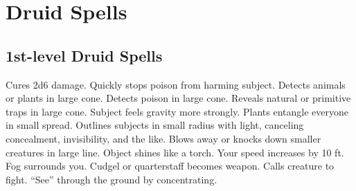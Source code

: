 \section{Druid Spells}\label{Druid Spells}

\subsection{1st-level Druid Spells}
\begin{spelllist}
   Cures 2d6 damage.
   Quickly stops poison from harming subject.
   Detects animals or plants in large cone.
   Detects poison in large cone.
   Reveals natural or primitive traps in large cone.
   Subject feels gravity more strongly.
   Plants entangle everyone in small spread.
   Outlines subjects in small radius with light, canceling concealment, invisibility, and the like.
   Blows away or knocks down smaller creatures in large line.
   Object shines like a torch.
   Your speed increases by 10 ft.
   Fog surrounds you.
   Cudgel or quarterstaff becomes  weapon.
   Calls creature to fight.
   ``See'' through the ground by concentrating.
\end{spelllist}


